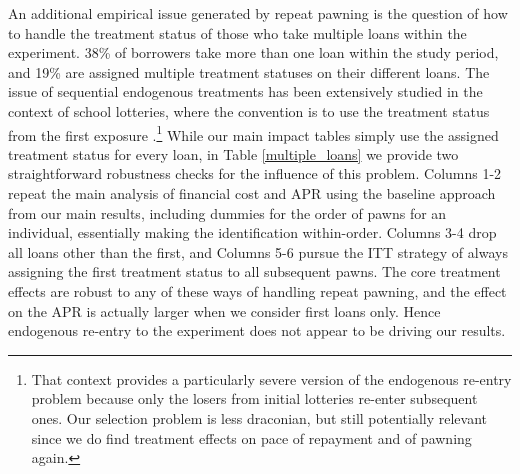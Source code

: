 \documentclass[oneside,11pt]{article}
\begin{document}


An additional empirical issue generated by repeat pawning is the question of how to handle the treatment status of those who take multiple loans within the experiment.  38\% of borrowers take more than one loan within the study period, and 19\% are assigned multiple treatment statuses on their different loans.  The issue of sequential endogenous treatments has been extensively studied in the context of school lotteries, where the convention is to use the treatment status from the first exposure \citep{cullen2006effect, abdulkadirouglu2011accountability}.\footnote{That context provides a particularly severe version of the endogenous re-entry problem because only the losers from initial lotteries re-enter subsequent ones.  Our selection problem is less draconian, but still potentially relevant since we do find treatment effects on pace of repayment and of pawning again.}  While our main impact tables simply use the assigned treatment status for every loan, in Table \ref{multiple_loans} we provide two straightforward robustness checks for the influence of this problem.  Columns 1-2 repeat the main analysis of financial cost and APR using the baseline approach from our main results, including dummies for the order of pawns for an individual, essentially making the identification within-order.  Columns 3-4 drop all loans other than the first, and Columns 5-6 pursue the ITT strategy of always assigning the first treatment status to all subsequent pawns. The core treatment effects are robust to any of these ways of handling repeat pawning, and the effect on the APR is actually larger when we consider first loans only.  Hence endogenous re-entry to the experiment does not appear to be driving our results.   
\end{document}
